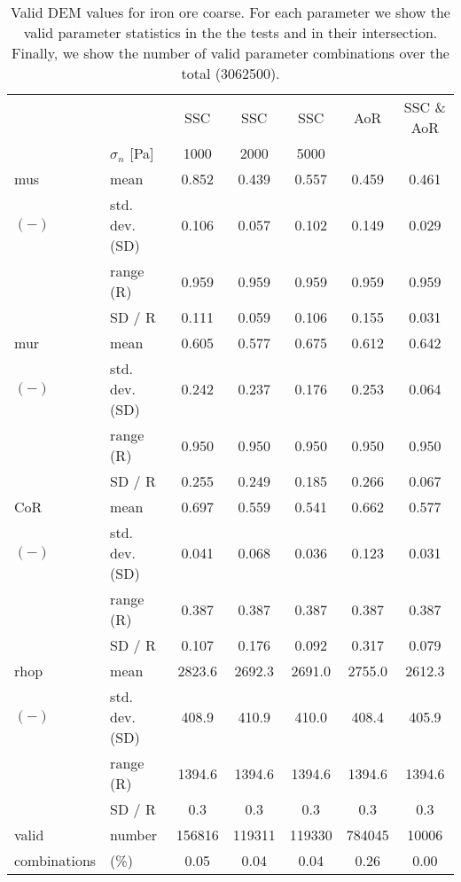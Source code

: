 \begin{table}[htbp] 
 \centering 
\begin{tabular}{ll|ccccc} 
 \hline 
 &    & SSC & SSC & SSC & AoR   & SSC \& AoR \\ 
 & $\sigma_n$  [Pa]  & 1000 & 2000 & 5000 &   &  \\ 
 \hline 
\acs{mus} & mean & 0.852 & 0.439 & 0.557 & 0.459 & 0.461 \\ 
$(-)$ & std. dev. (SD) & 0.106 & 0.057 & 0.102 & 0.149 & 0.029 \\ 
 & range (\acs{R}) & 0.959 & 0.959 & 0.959 & 0.959 & 0.959 \\ 
 & SD / R & 0.111 & 0.059 & 0.106 & 0.155 & 0.031 \\ 
 \hline 
\acs{mur} & mean & 0.605 & 0.577 & 0.675 & 0.612 & 0.642 \\ 
$(-)$ & std. dev. (SD) & 0.242 & 0.237 & 0.176 & 0.253 & 0.064 \\ 
 & range (\acs{R}) & 0.950 & 0.950 & 0.950 & 0.950 & 0.950 \\ 
 & SD / R & 0.255 & 0.249 & 0.185 & 0.266 & 0.067 \\ 
 \hline 
\acs{CoR} & mean & 0.697 & 0.559 & 0.541 & 0.662 & 0.577 \\ 
$(-)$ & std. dev. (SD) & 0.041 & 0.068 & 0.036 & 0.123 & 0.031 \\ 
 & range (\acs{R}) & 0.387 & 0.387 & 0.387 & 0.387 & 0.387 \\ 
 & SD / R & 0.107 & 0.176 & 0.092 & 0.317 & 0.079 \\ 
 \hline 
\acs{rhop} & mean & 2823.6 & 2692.3 & 2691.0 & 2755.0 & 2612.3 \\ 
$(-)$ & std. dev. (SD) & 408.9 & 410.9 & 410.0 & 408.4 & 405.9 \\ 
 & range (\acs{R}) & 1394.6 & 1394.6 & 1394.6 & 1394.6 & 1394.6 \\ 
 & SD / R &  0.3 &  0.3 &  0.3 &  0.3 &  0.3 \\ 
 \hline 
valid & number & 156816 & 119311 & 119330 & 784045 & 10006 \\ 
combinations & (\%)  & 0.05 & 0.04 & 0.04 & 0.26 & 0.00 \\ 
 \hline 
\end{tabular} 
\caption[Valid DEM values for iron ore coarse]{Valid DEM values for
iron ore coarse. For each parameter we show the valid parameter statistics in
the the tests and in their intersection. Finally, we show the number of valid parameter combinations over the total (3062500).}
\label{tab:27DEMvalidvaluesironorecoarse} 
\end{table}